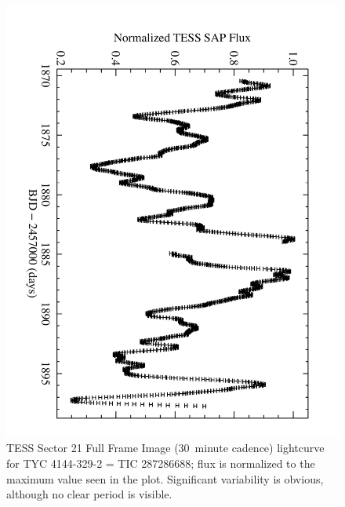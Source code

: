 \documentclass[letterpaper,11pt]{article}
\begin{document}
\begin{figure}
\includegraphics[angle=90,width=.5\textwidth]{TESSlc}
\caption{TESS Sector 21 Full Frame Image (30~minute cadence) lightcurve for TYC 4144-329-2 = TIC 287286688;
               flux is normalized to the maximum value seen in the plot. Significant variability is obvious, although no clear period is visible.}
\label{fig:TESS}
\end{figure}
\end{document}

